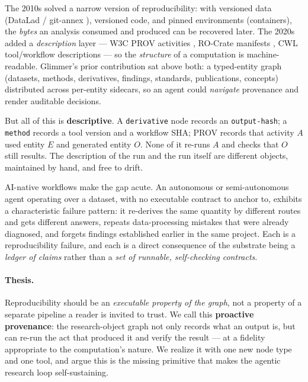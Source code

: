 \documentclass[preprint]{glimmer-paper}
\newcommand{\code}[1]{\texttt{#1}}
\begin{document}
The 2010s solved a narrow version of reproducibility: with versioned data
(DataLad / git-annex \citep{halchenko2021datalad}), versioned code, and pinned environments
(containers), the \emph{bytes} an analysis consumed and produced can be recovered later. The
2020s added a \emph{description} layer --- W3C PROV activities \citep{provdm2013}, RO-Crate
manifests \citep{soilandreyes2022rocrate}, CWL tool/workflow descriptions
\citep{crusoe2022cwl} --- so the \emph{structure} of a computation is machine-readable.
Glimmer's prior contribution \citep{eldamaty2026glimmer} sat above both: a typed-entity
graph (datasets, methods, derivatives, findings, standards, publications, concepts)
distributed across per-entity sidecars, so an agent could \emph{navigate} provenance and
render auditable decisions.

But all of this is \textbf{descriptive}. A \code{derivative} node records an
\code{output-hash}; a \code{method} records a tool version and a workflow SHA; PROV records
that activity $A$ used entity $E$ and generated entity $O$. None of it re-runs $A$ and checks
that $O$ still results. The description of the run and the run itself are different objects,
maintained by hand, and free to drift.

AI-native workflows make the gap acute. An autonomous or semi-autonomous agent operating
over a dataset, with no executable contract to anchor to, exhibits a characteristic failure
pattern: it re-derives the same quantity by different routes and gets different answers,
repeats data-processing mistakes that were already diagnosed, and forgets findings
established earlier in the same project. Each is a reproducibility failure, and each is a
direct consequence of the substrate being a \emph{ledger of claims} rather than a \emph{set
of runnable, self-checking contracts}.

\paragraph{Thesis.} Reproducibility should be an \emph{executable property of the graph}, not
a property of a separate pipeline a reader is invited to trust. We call this \textbf{proactive
provenance}: the research-object graph not only records what an output is, but can re-run the
act that produced it and verify the result --- at a fidelity appropriate to the
computation's nature. We realize it with one new node type and one tool, and argue this is
the missing primitive that makes the agentic research loop self-sustaining.
\end{document}
